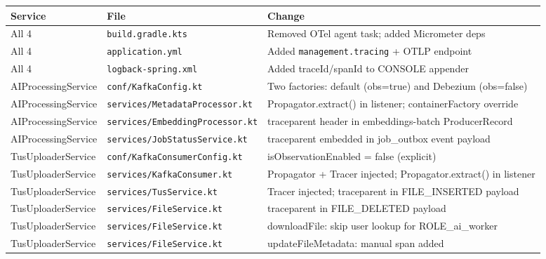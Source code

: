 \documentclass[11pt,a4paper]{article}
\begin{document}
\begin{center}
\begin{tabular}{lll}
\toprule
\textbf{Service} & \textbf{File} & \textbf{Change} \\
\midrule
All 4 & \texttt{build.gradle.kts}    & Removed OTel agent task; added Micrometer deps \\
All 4 & \texttt{application.yml}     & Added \texttt{management.tracing} + OTLP endpoint \\
All 4 & \texttt{logback-spring.xml}  & Added traceId/spanId to CONSOLE appender \\
\midrule
AIProcessingService & \texttt{conf/KafkaConfig.kt}
  & Two factories: default (obs=true) and Debezium (obs=false) \\
AIProcessingService & \texttt{services/MetadataProcessor.kt}
  & Propagator.extract() in listener; containerFactory override \\
AIProcessingService & \texttt{services/EmbeddingProcessor.kt}
  & traceparent header in embeddings-batch ProducerRecord \\
AIProcessingService & \texttt{services/JobStatusService.kt}
  & traceparent embedded in job\_outbox event payload \\
\midrule
TusUploaderService & \texttt{conf/KafkaConsumerConfig.kt}
  & isObservationEnabled = false (explicit) \\
TusUploaderService & \texttt{services/KafkaConsumer.kt}
  & Propagator + Tracer injected; Propagator.extract() in listener \\
TusUploaderService & \texttt{services/TusService.kt}
  & Tracer injected; traceparent in FILE\_INSERTED payload \\
TusUploaderService & \texttt{services/FileService.kt}
  & traceparent in FILE\_DELETED payload \\
TusUploaderService & \texttt{services/FileService.kt}
  & downloadFile: skip user lookup for ROLE\_ai\_worker \\
TusUploaderService & \texttt{services/FileService.kt}
  & updateFileMetadata: manual span added \\
\bottomrule
\end{tabular}
\end{center}
\end{document}
